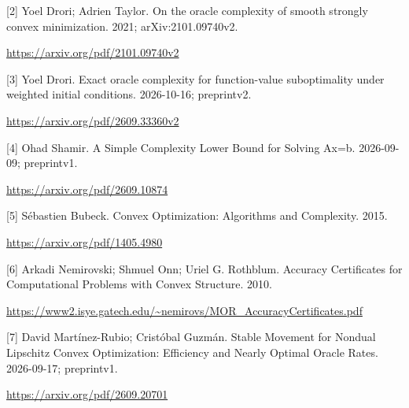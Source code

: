 \documentclass[10pt,a4paper]{article}
\begin{document}
[2] Yoel Drori; Adrien Taylor. On the oracle complexity of smooth strongly convex minimization. 2021; arXiv:2101.09740v2.

\url{https://arxiv.org/pdf/2101.09740v2}

[3] Yoel Drori. Exact oracle complexity for function-value suboptimality under weighted initial conditions. 2026-10-16; preprintv2.

\url{https://arxiv.org/pdf/2609.33360v2}

[4] Ohad Shamir. A Simple Complexity Lower Bound for Solving Ax=b. 2026-09-09; preprintv1.

\url{https://arxiv.org/pdf/2609.10874}

[5] Sébastien Bubeck. Convex Optimization: Algorithms and Complexity. 2015.

\url{https://arxiv.org/pdf/1405.4980}

[6] Arkadi Nemirovski; Shmuel Onn; Uriel G. Rothblum. Accuracy Certificates for Computational Problems with Convex Structure. 2010.

\url{https://www2.isye.gatech.edu/~nemirovs/MOR_AccuracyCertificates.pdf}

[7] David Martínez-Rubio; Cristóbal Guzmán. Stable Movement for Nondual Lipschitz Convex Optimization: Efficiency and Nearly Optimal Oracle Rates. 2026-09-17; preprintv1.

\url{https://arxiv.org/pdf/2609.20701}
\end{document}
